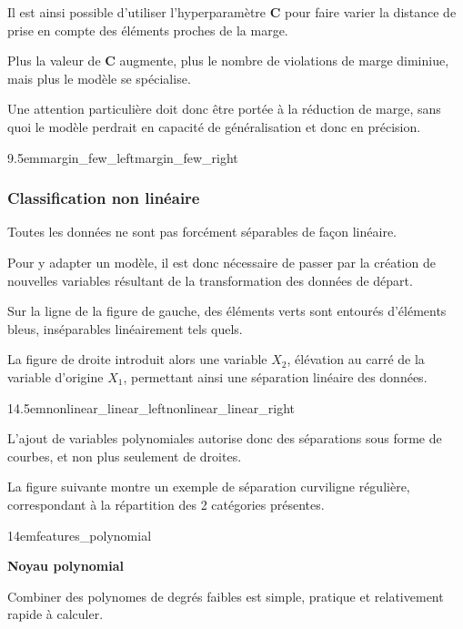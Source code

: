 Il est ainsi possible d’utiliser l’hyperparamètre \textbf{C} pour faire
varier la distance de prise en compte des éléments proches de la marge.

Plus la valeur de \textbf{C} augmente, plus le nombre de violations de
marge diminiue, mais plus le modèle se spécialise.

Une attention particulière doit donc être portée à la réduction de marge,
sans quoi le modèle perdrait en capacité de généralisation
et donc en précision.

{9.5em}{margin_few_left}{margin_few_right}

\pagebreak

\subsubsection{Classification non linéaire}

Toutes les données ne sont pas forcément séparables de façon linéaire.

Pour y adapter un modèle, il est donc nécessaire de passer par la création
de nouvelles variables résultant de la transformation des données de départ.

Sur la ligne de la figure de gauche, des éléments verts sont entourés d’éléments bleus, inséparables linéairement tels quels.

La figure de droite introduit alors une variable $X_{2}$, élévation
au carré de la variable d’origine $X_{1}$, permettant ainsi
une séparation linéaire des données.

{14.5em}{nonlinear_linear_left}{nonlinear_linear_right}

L’ajout de variables polynomiales autorise donc des séparations sous
forme de courbes, et non plus seulement de droites.

La figure suivante montre un exemple de séparation curviligne régulière,
correspondant à la répartition des 2 catégories présentes.

{14em}{features_polynomial}

\pagebreak

\textbf{Noyau polynomial}

Combiner des polynomes de degrés faibles est simple, pratique et
relativement rapide à calculer.

